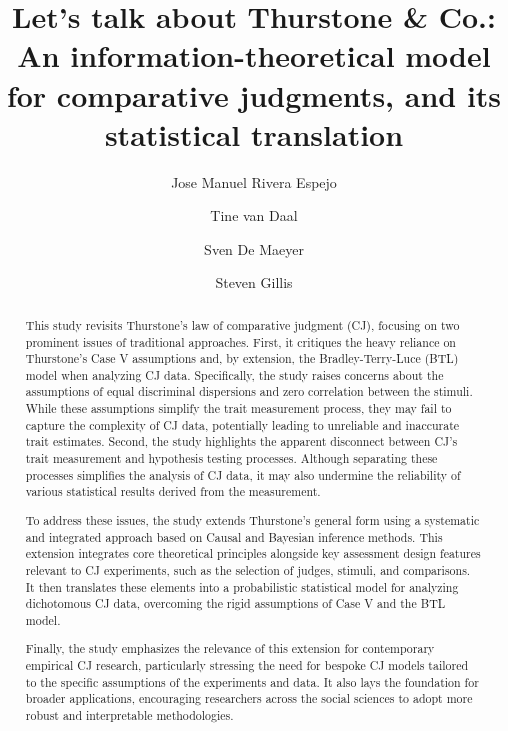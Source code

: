 \documentclass[
  authoryear,
  review,
  1p]{elsarticle}
\begin{document}
\begin{frontmatter}
\title{Let's talk about Thurstone \& Co.: An information-theoretical
model for comparative judgments, and its statistical translation}
\author[1]{Jose Manuel Rivera Espejo%
%
}
\author[1]{Tine van Daal%
%
}
\author[1]{Sven De Maeyer%
%
}
\author[2]{Steven Gillis%
%
}






        
\begin{abstract}
This study revisits Thurstone's law of comparative judgment (CJ),
focusing on two prominent issues of traditional approaches. First, it
critiques the heavy reliance on Thurstone's Case V assumptions and, by
extension, the Bradley-Terry-Luce (BTL) model when analyzing CJ data.
Specifically, the study raises concerns about the assumptions of equal
discriminal dispersions and zero correlation between the stimuli. While
these assumptions simplify the trait measurement process, they may fail
to capture the complexity of CJ data, potentially leading to unreliable
and inaccurate trait estimates. Second, the study highlights the
apparent disconnect between CJ's trait measurement and hypothesis
testing processes. Although separating these processes simplifies the
analysis of CJ data, it may also undermine the reliability of various
statistical results derived from the measurement.

To address these issues, the study extends Thurstone's general form
using a systematic and integrated approach based on Causal and Bayesian
inference methods. This extension integrates core theoretical principles
alongside key assessment design features relevant to CJ experiments,
such as the selection of judges, stimuli, and comparisons. It then
translates these elements into a probabilistic statistical model for
analyzing dichotomous CJ data, overcoming the rigid assumptions of Case
V and the BTL model.

Finally, the study emphasizes the relevance of this extension for
contemporary empirical CJ research, particularly stressing the need for
bespoke CJ models tailored to the specific assumptions of the
experiments and data. It also lays the foundation for broader
applications, encouraging researchers across the social sciences to
adopt more robust and interpretable methodologies.
\end{abstract}






\end{frontmatter}
\end{document}
